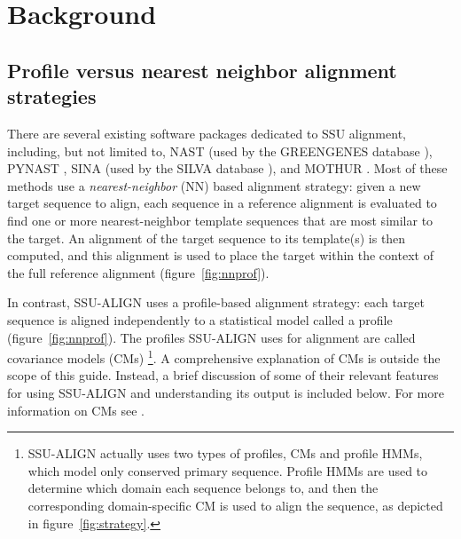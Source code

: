 \section{Background}
\label{sec:background}


\subsection{Profile versus nearest neighbor alignment strategies}

There are several existing software packages dedicated to
SSU alignment, including, but not limited to, NAST
\cite{DeSantis06} (used by the GREENGENES database
\cite{DeSantis06a}), PYNAST \cite{Caporaso10},
SINA (used by the SILVA database
\cite{Pruesse07}), and MOTHUR \cite{Schloss09}.
Most of these methods use a \emph{nearest-neighbor}
(NN) based alignment strategy: given a new target sequence to align,
each sequence in a reference alignment is evaluated to find one or
more nearest-neighbor template sequences that are most similar to the
target. An alignment of the target sequence to its template(s) is then
computed, and this alignment is used to place the target within the
context of the full reference alignment (figure~\ref{fig:nnprof}).

In contrast, SSU-ALIGN uses a profile-based alignment
strategy: each target sequence is aligned independently to a
statistical model called a profile
(figure~\ref{fig:nnprof}). The profiles SSU-ALIGN uses for
alignment are called covariance models (CMs)
\footnote{SSU-ALIGN actually uses two types of profiles,
  CMs and profile HMMs, which model only conserved primary
  sequence. Profile HMMs are used to determine which domain each
  sequence belongs to, and then the corresponding domain-specific CM
  is used to align the sequence, as depicted in
  figure~\ref{fig:strategy}.}.
A comprehensive explanation of CMs is outside the scope of this
guide. Instead, a brief discussion of some of their relevant features
for using SSU-ALIGN and understanding its output is included
below. For more information on CMs see
\cite{Eddy94,Durbin98,Eddy02b,NawrockiEddy07,Nawrocki09,Nawrocki09b,KolbeEddy09}.

